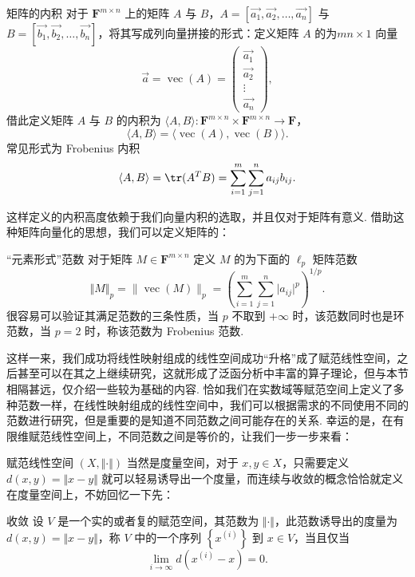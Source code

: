 \begin{definition}{矩阵的内积}{} 
    对于 $\mathbf{F}^{m\times n}$ 上的矩阵 $A$ 与 $B$，$A = \left[\vec{a_1}, \vec{a_2}, \ldots, \vec{a_n}\right]$ 与 $B = \left[\vec{b_1}, \vec{b_2}, \ldots, \vec{b_n}\right]$，将其写成列向量拼接的形式：定义矩阵 $A$ 的为$mn \times 1$ 向量 \[\vec{a} = \operatorname{vec}(A) = \begin{pmatrix} \vec{a_1} \\ \vec{a_2} \\ \vdots \\ \vec{a_n} \end{pmatrix},\]
    借此定义矩阵 $A$ 与 $B$ 的内积为 $\langle A, B\rangle \colon \mathbf{F}^{m\times n}\times\mathbf{F}^{m\times n}\to\mathbf{F}$，\[\langle A, B\rangle = \langle \operatorname{vec}(A), \operatorname{vec}(B)\rangle.\]
    常见形式为 Frobenius 内积 \[\langle A, B\rangle = \tr(A^{T}B) = \sum_{i=1}^{m}\sum_{j=1}^{n}a_{ij}b_{ij}.\]
\end{definition}

这样定义的内积高度依赖于我们向量内积的选取，并且仅对于矩阵有意义. 借助这种矩阵向量化的思想，我们可以定义矩阵的：

\begin{definition}{``元素形式''范数}{}
    对于矩阵 $M\in \mathbf{F}^{m\times n}$ 定义 $M$ 的为下面的 $\ell_p$ 矩阵范数 \[\Vert M\Vert_p = \lVert \operatorname{vec}(M) \rVert _p = \left(\sum_{i = 1}^{m}\sum_{j = 1}^{n} \vert a_{ij}\vert^p\right)^{1/p}.\]
    很容易可以验证其满足范数的三条性质，当 $p$ 不取到 $+\infty$ 时，该范数同时也是环范数，当 $p = 2$ 时，称该范数为 Frobenius 范数.
\end{definition}

这样一来，我们成功将线性映射组成的线性空间成功``升格''成了赋范线性空间，之后甚至可以在其之上继续研究，这就形成了泛函分析中丰富的算子理论，但与本节相隔甚远，仅介绍一些较为基础的内容. 恰如我们在实数域等赋范空间上定义了多种范数一样，在线性映射组成的线性空间中，我们可以根据需求的不同使用不同的范数进行研究，但是重要的是知道不同范数之间可能存在的关系. 幸运的是，在有限维赋范线性空间上，不同范数之间是等价的，让我们一步一步来看：

赋范线性空间 $(X, \Vert \cdot \Vert)$ 当然是度量空间，对于 $x, y\in X$，只需要定义 $d(x, y) = \Vert x-y\Vert$ 就可以轻易诱导出一个度量，而连续与收敛的概念恰恰就定义在度量空间上，不妨回忆一下先：

\begin{definition}{收敛}{}
    设 $V$ 是一个实的或者复的赋范空间，其范数为 $\Vert \cdot \Vert$，此范数诱导出的度量为 $d(x, y) = \Vert x - y\Vert$，称 $V$ 中的一个序列 $\left\{x^{(i)}\right\}$ 到 $x\in V$，当且仅当 \[\lim_{i\to\infty}d(x^{(i)} - x) = 0.\]
\end{definition}

